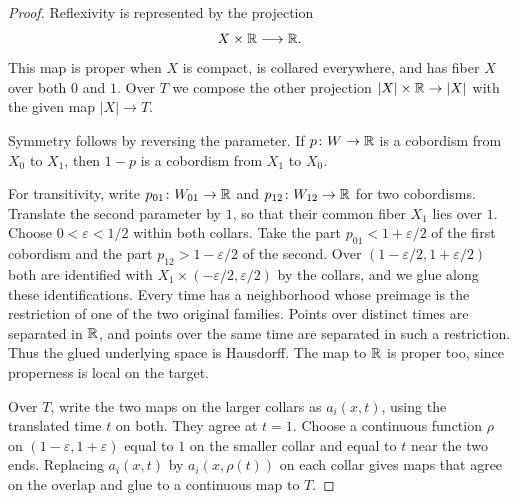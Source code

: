 \begin{proof}
  Reflexivity is represented by the projection
  \[
    X\times\mathbb{R}\longrightarrow\mathbb{R}.
  \]
  This map is proper when $X$ is compact, is collared everywhere, and has
  fiber $X$ over both $0$ and $1$. Over $T$ we compose the other
  projection $|X|\times\mathbb{R}\to |X|$ with the given map $|X|\to T$.

  Symmetry follows by reversing the parameter. If $p\colon W\to\mathbb{R}$ is a
  cobordism from $X_0$ to $X_1$, then $1-p$ is a cobordism from $X_1$ to
  $X_0$.

  For transitivity, write $p_{01}\colon W_{01}\to\mathbb{R}$ and
  $p_{12}\colon W_{12}\to\mathbb{R}$ for two cobordisms. Translate the second
  parameter by $1$, so that their common fiber $X_1$ lies over $1$. Choose
  $0<\varepsilon<1/2$ within both collars. Take the part
  $p_{01}<1+\varepsilon/2$ of the first cobordism and the part
  $p_{12}>1-\varepsilon/2$ of the second. Over
  $(1-\varepsilon/2,1+\varepsilon/2)$ both are identified with
  $X_1\times(-\varepsilon/2,\varepsilon/2)$ by the collars, and we glue
  along these identifications. Every time has a neighborhood whose
  preimage is the restriction of one of the two original families.
  Points over distinct times are separated in $\mathbb{R}$, and points over
  the same time are separated in such a restriction. Thus the glued
  underlying space is Hausdorff. The map to $\mathbb{R}$ is proper too, since
  properness is local on the target.

  Over $T$, write the two maps on the larger collars as $a_i(x,t)$,
  using the translated time $t$ on both. They agree at $t=1$.
  Choose a continuous function $\rho$ on $(1-\varepsilon,1+\varepsilon)$
  equal to $1$ on the smaller collar and equal to $t$ near the two ends.
  Replacing $a_i(x,t)$ by $a_i(x,\rho(t))$ on each collar gives maps
  that agree on the overlap and glue to a continuous map to $T$.


\end{proof}
